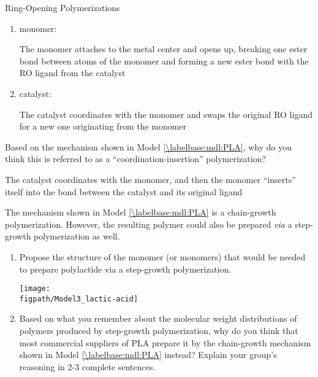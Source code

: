 \begin{activity}{Ring-Opening Polymerizations}
\begin{ctqs}
		\begin{enumerate}
			\item monomer:
			
				\begin{solution}[0.5in]{}
					The monomer attaches to the metal center and opens up, breaking one ester bond between atoms of the monomer and forming a new ester bond with the RO ligand from the catalyst
				\end{solution}
			
			\item catalyst:
			
				\begin{solution}[0.5in]{}
					The catalyst coordinates with the monomer and swaps the original RO ligand for a new one originating from the monomer
				\end{solution}
				
		\end{enumerate}
		
	\question Based on the mechanism shown in Model \ref{\labelbase:mdl:PLA}, why do you think this is referred to as a ``coordination-insertion'' polymerization?
			
				\begin{solution}[1in]{}
					The catalyst coordinates with the monomer, and then the monomer ``inserts'' itself into the bond between the catalyst and its original ligand
				\end{solution}
				
	
	\question The mechanism shown in Model \ref{\labelbase:mdl:PLA} is a chain-growth polymerization.  However, the resulting polymer could also be prepared \emph{via} a step-growth polymerization as well.
	
		\begin{enumerate}
			\item Propose the structure of the monomer (or monomers) that would be needed to prepare polylactide via a step-growth polymerization.
			
				\begin{solution}[1in]{}
					\centerline{\texttt{[image: \\figpath/Model3\_lactic-acid]}}
				\end{solution}
			
			\item Based on what you remember about the molecular weight distributions of polymers produced by step-growth polymerization, why do you think that most commercial suppliers of PLA prepare it by the chain-growth mechanism shown in Model \ref{\labelbase:mdl:PLA} instead?  Explain your group's reasoning in 2-3 complete sentences.
			

\end{enumerate}
\end{ctqs}
\end{activity}
